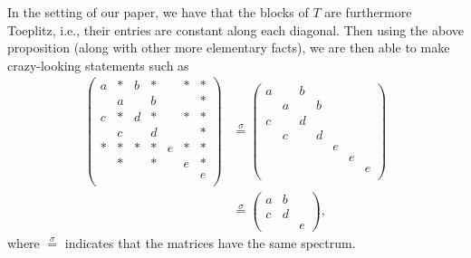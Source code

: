\documentclass{article}
\begin{document}
In the setting of our paper, we have that the blocks of $T$ are furthermore Toeplitz, i.e., their entries are constant along each diagonal. Then using the above proposition (along with other more elementary facts), we are then able to make crazy-looking statements such as
\begin{align*}
\begin{pmatrix}
	a & * & b & * & & * & *\\
	  & a & & b & & & *\\
	c & * & d & * & & * & *\\
	  & c & & d & & & *\\
	* & * & * & * & e & * & *\\
	 & * & & * & & e & *\\
	 &  & &  & &  & e\\
\end{pmatrix}
&\stackrel{\sigma}{=}
\begin{pmatrix}
	a &  & b &  & &  & \\
	  & a & & b & & & \\
	c &  & d &  & &  & \\
	  & c & & d & & & \\
	 &  &  &  & e &  & \\
	 &  & &  & & e & \\
	 &  & &  & &  & e\\
\end{pmatrix}\\
&\stackrel{\sigma}{=}
\begin{pmatrix}
	a & b&\\
	c & d&\\
	&&e
\end{pmatrix},
\end{align*}
where $\stackrel{\sigma}{=}$ indicates that the matrices have the same spectrum.
\end{document}
